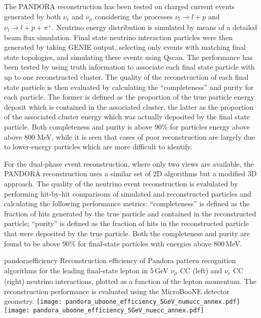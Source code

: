 The PANDORA reconstruction has been tested on charged current events generated by both   $\nu_{e}$  and $\nu_{\mu}$  
considering the processes $\nu_{l}\to l+p$  and $\nu_{l}\to l+p+\pi^{+}$.
Neutrino energy distribution is simulated by means of a detailed beam flux simulation.
Final state neutrino interaction particles were then generated by taking GENIE output, selecting only events with matching final state topologies, 
and simulating these events using Qscan.
 The performance has been tested by using truth information to associate each final state particle with up to one reconstructed cluster.
The quality of the reconstruction of each final state particle is then evaluated by calculating the ``completeness'' and purity for each particle.
The former is defined as the proportion of the true particle energy deposit which 
is contained in the associated cluster, the latter as  the proportion of the associated cluster energy which was actually deposited by the final state particle.
Both completeness and purity is above 90$\%$ for particles energy above above 800 MeV, while
it is seen that cases of poor reconstruction are largely due to lower-energy particles which are more difficult to identify.


For the dual-phase event reconstruction, where only two views are available,
the PANDORA reconstruction uses a similar set of 2D algorithms but
a modified 3D approach. The quality of the neutrino event reconstruction 
is evalulated by performing hit-by-hit comparisons of simulated and 
reconstructed particles and calculating the following performance metrics: 
``completeness'' is defined as the fraction of hits generated by 
the true particle and contained in the reconstructed particle; 
``purity'' is defined as the fraction of hits in the reconstructed 
particle that were deposited by the true particle. 
Both the completeness and purity are found to be above 90$\%$ for 
final-state particles with energies above 800\,MeV.


\begin{cdrfigure}{pandoraefficiency}
{Reconstruction efficiency of Pandora pattern recognition algorithms
 for the leading final-state lepton in 5\,GeV $\nu_{\mu}$ CC (left) and
 $\nu_{e}$ CC (right) neutrino interactions, plotted as a function of
 the lepton momentum. The reconstruction performance is evaluated
 using the MicroBooNE detector geometry. }
\texttt{[image: pandora\_uboone\_efficiency\_5GeV\_numucc\_annex.pdf]}
\texttt{[image: pandora\_uboone\_efficiency\_5GeV\_nuecc\_annex.pdf]}
\end{cdrfigure}

